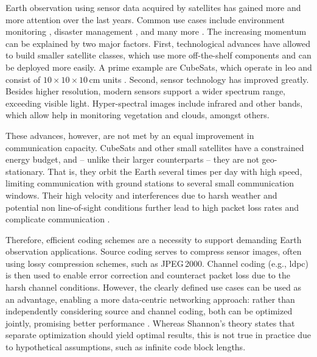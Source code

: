 \documentclass[conference]{IEEEtran}
\newcommand\jpegtwok{JPEG\,2000\xspace}
\begin{document}
Earth observation using sensor data acquired by satellites has gained more and more attention over the last years.
Common use cases include environment monitoring \cite{rs14030589}, disaster management \cite{barmpoutis2020}, and many more \cite{radix,MarCO}.
The increasing momentum can be explained by two major factors.
First, technological advances have allowed to build smaller satellite classes, which use more off-the-shelf components and can be deployed more easily.
A prime example are CubeSats, which operate in \ac{leo} and consist of $10 \times 10 \times 10$\,cm units \cite{cubesat2020}.
Second, sensor technology has improved greatly.
Besides higher resolution, modern sensors support a wider spectrum range, exceeding visible light.
Hyper-spectral images include infrared and other bands, which allow help in monitoring vegetation and clouds, amongst others.

These advances, however, are not met by an equal improvement in communication capacity.
CubeSats and other small satellites have a constrained energy budget, and -- unlike their larger counterparts -- they are not geo-stationary.
That is, they orbit the Earth several times per day with high speed, limiting communication with ground stations to several small communication windows.
Their high velocity and interferences due to harsh weather and potential non line-of-sight conditions further lead to high packet loss rates and complicate communication \cite{nogales2018}.

Therefore, efficient coding schemes are a necessity to support demanding Earth observation applications.
Source coding serves to compress sensor images, often using lossy compression schemes, such as \jpegtwok \cite{sentinel-2-user-handbook}.
Channel coding (e.g., \ac{ldpc}) is then used to enable error correction and counteract packet loss due to the harsh channel conditions.
However, the clearly defined use cases can be used as an advantage, enabling a more data-centric networking approach:
rather than independently considering source and channel coding, both can be optimized jointly, promising better performance \cite{6408177}.
Whereas Shannon's theory \cite{cover1991elements} states that separate optimization should yield optimal results, this is not true in practice due to hypothetical assumptions, such as infinite code block lengths.
\end{document}
